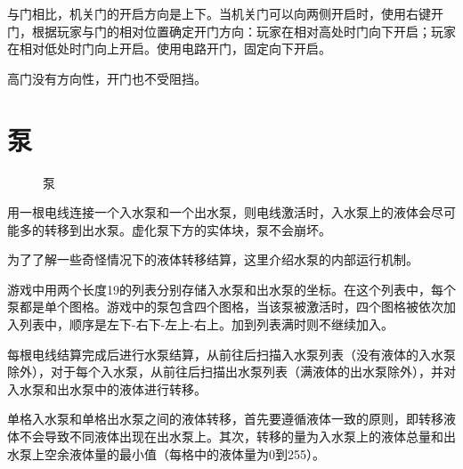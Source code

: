 与门相比，机关门的开启方向是上下。当机关门可以向两侧开启时，使用右键开门，根据玩家与门的相对位置确定开门方向：玩家在相对高处时门向下开启；玩家在相对低处时门向上开启。使用电路开门，固定向下开启。

高门没有方向性，开门也不受阻挡。

\section{泵}
\begin{figure}[!ht]
\centering
{}\qquad
{}
\caption{泵}
\end{figure}
用一根电线连接一个入水泵和一个出水泵，则电线激活时，入水泵上的液体会尽可能多的转移到出水泵。虚化泵下方的实体块，泵不会崩坏。

为了了解一些奇怪情况下的液体转移结算，这里介绍水泵的内部运行机制。

游戏中用两个长度19的列表分别存储入水泵和出水泵的坐标。在这个列表中，每个泵都是单个图格。游戏中的泵包含四个图格，当该泵被激活时，四个图格被依次加入列表中，顺序是左下-右下-左上-右上。加到列表满时则不继续加入。

每根电线结算完成后进行水泵结算，从前往后扫描入水泵列表（没有液体的入水泵除外），对于每个入水泵，从前往后扫描出水泵列表（满液体的出水泵除外），并对入水泵和出水泵中的液体进行转移。

单格入水泵和单格出水泵之间的液体转移，首先要遵循液体一致的原则，即转移液体不会导致不同液体出现在出水泵上。其次，转移的量为入水泵上的液体总量和出水泵上空余液体量的最小值（每格中的液体量为0到255）。

